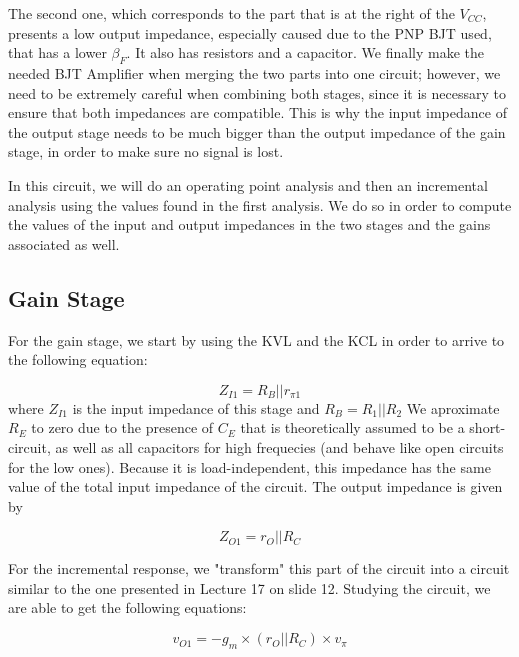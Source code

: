 \par The second one, which corresponds to the part that is at the right of the $V_{CC}$, presents a low output impedance, especially caused due to the PNP BJT used, that has a lower $\beta_F$. It also has resistors and a capacitor. We finally make the needed BJT Amplifier when merging the two parts into one circuit; however, we need to be extremely careful when combining both stages, since it is necessary to ensure that both impedances are compatible. This is why the input impedance of the output stage needs to be much bigger than the output impedance of the gain stage, in order to make sure no signal is lost.



\par In this circuit, we will do an operating point analysis and then an incremental analysis using the values found in the first analysis. We do so in order to compute the values of the input and output impedances in the two stages and the gains associated as well.

\subsection{Gain Stage}

For the gain stage, we start by using the KVL and the KCL in order to arrive to the following equation:

\begin{equation}
Z_{I1} = R_B||r_{\pi1}
\label{eq:1.1}
\end{equation}
where $Z_{I1}$ is the input impedance of this stage and $R_B = R_1 || R_2$
We aproximate $R_E$ to zero due to the presence of $C_E$ that is theoretically assumed to be a short-circuit, as well as all capacitors for high frequecies (and behave like open circuits for the low ones). Because it is load-independent, this impedance has the same value of the total input impedance of the circuit.
The output impedance is given by 

\begin{equation}
Z_{O1} = r_O||R_C
\label{eq:1.2}
\end{equation}

For the incremental response, we "transform" this part of the circuit into a circuit similar to the one presented in Lecture 17 on slide 12. Studying the circuit, we are able to get the following equations:

\begin{equation}
v_{O1} = -g_m \times (r_O||R_C) \times v_\pi
\label{eq:1.3}
\end{equation}

